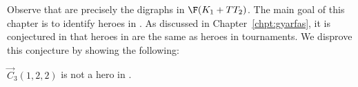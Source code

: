 


Observe that \omgs are precisely the digraphs in $\F( K_1 + TT_2)$.  
The main goal of this chapter is to identify heroes in \omgs.  
As discussed in Chapter~\ref{chpt:gyarfas}, it is conjectured in \cite{ACN21} that heroes in \omgs are the same as heroes in tournaments. We disprove this conjecture by showing  the following:  




\begin{theorem}\label{thm:ce} 
$\vec C_{3}(1,2,2)$ is not a hero in \omgs.
\end{theorem}

